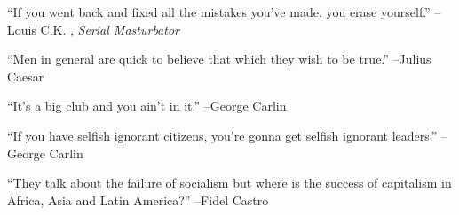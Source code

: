\documentclass{article}%
\begin{document}
\linebreak%
\vspace{1mm}%
\begin{minipage}{\textwidth}%
\flushleft%
“If you went back and fixed all the mistakes you've made, you erase yourself.”%
\linebreak%
\vspace{1mm}%
–Louis C.K.%
, \textit{Serial Masturbator}%
\linebreak%
\vspace{1mm}%
\end{minipage}%
\linebreak%
\vspace{1mm}%
\begin{minipage}{\textwidth}%
\flushleft%
“Men in general are quick to believe that which they wish to be true.”%
\linebreak%
\vspace{1mm}%
–Julius Caesar%
\linebreak%
\vspace{1mm}%
\end{minipage}%
\linebreak%
\vspace{1mm}%
\begin{minipage}{\textwidth}%
\flushleft%
“It's a big club and you ain't in it.”%
\linebreak%
\vspace{1mm}%
–George Carlin%
\linebreak%
\vspace{1mm}%
\end{minipage}%
\linebreak%
\vspace{1mm}%
\begin{minipage}{\textwidth}%
\flushleft%
“If you have selfish ignorant citizens, you're gonna get selfish ignorant leaders.”%
\linebreak%
\vspace{1mm}%
–George Carlin%
\linebreak%
\vspace{1mm}%
\end{minipage}%
\linebreak%
\vspace{1mm}%
\begin{minipage}{\textwidth}%
\flushleft%
“They talk about the failure of socialism but where is the success of capitalism in Africa, Asia and Latin America?”%
\linebreak%
\vspace{1mm}%
–Fidel Castro%
\linebreak%
\vspace{1mm}%
\end{minipage}%
\end{document}
